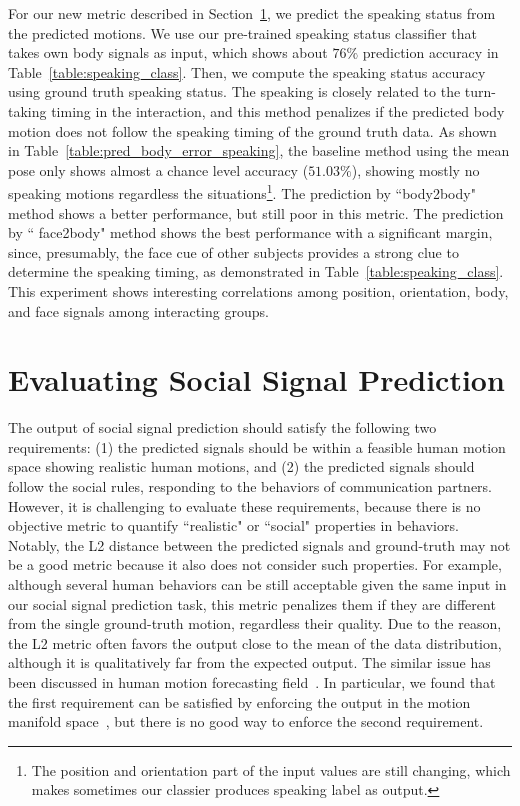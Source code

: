For our new metric described in Section~\ref{section:evaluation}, we predict the speaking status from the predicted motions. We use our pre-trained speaking status classifier that takes own body signals as input, which shows about $76\%$ prediction accuracy in Table~\ref{table:speaking_class}. Then, we compute the speaking status accuracy using ground truth speaking status. The speaking is closely related to the turn-taking timing in the interaction, and this method penalizes if the predicted body motion does not follow the speaking timing of the ground truth data. As shown in Table~\ref{table:pred_body_error_speaking}, the baseline method using the mean pose only shows almost a chance level accuracy ($51.03\%$), showing mostly no speaking motions regardless the situations\footnote{The position and orientation part of the input values are still changing, which makes sometimes our classier produces speaking label as output.}. The prediction by ``body2body" method shows a better performance, but still poor in this metric. The prediction by `` face2body" method shows the best performance with a significant margin, since, presumably, the face cue of other subjects provides a strong clue to determine the speaking timing, as demonstrated in Table~\ref{table:speaking_class}. This experiment shows interesting correlations among position, orientation, body, and face signals among interacting groups. %



\section{Evaluating Social Signal Prediction}
\label{section:evaluation}
The output of social signal prediction should satisfy the following two requirements: (1) the predicted signals should be within a feasible human motion space showing realistic human motions, and (2) the predicted signals should follow the social rules, responding to the behaviors of communication partners. However, it is challenging to evaluate these requirements, because there is no objective metric to quantify ``realistic" or ``social" properties in behaviors. Notably, the L2 distance between the predicted signals and ground-truth may not be a good metric because it also does not consider such properties. For example, although several human behaviors can be still acceptable given the same input in our social signal prediction task, this metric penalizes them if they are different from the single ground-truth motion, regardless their quality. Due to the reason, the L2 metric often favors the output close to the mean of the data distribution, although it is qualitatively far from the expected output. The similar issue has been discussed in human motion forecasting field~\cite{mnih2012conditional, Fragkiadaki_2015_ICCV, jain2016structural, zhou2018autoconditioned}. In particular, we found that the first requirement can be satisfied by enforcing the output in the motion manifold space~\cite{holden2016deep}, but there is no good way to enforce the second requirement.


